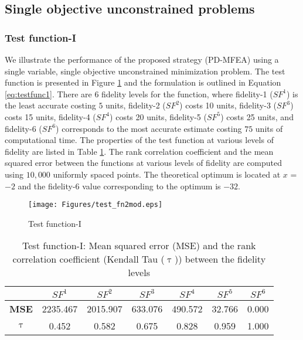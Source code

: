\subsection{Single objective unconstrained problems}

\subsubsection{Test function-I}
We illustrate the performance of the proposed strategy (PD-MFEA) using a single variable, single objective unconstrained minimization problem. The test function is presented in Figure \ref{fig:test_fn2mod} and the formulation is outlined in Equation \ref{eq:testfunc1}. There are $6$ fidelity levels for the function, where fidelity-1 ($SF^1$) is the least accurate costing $5$ units, fidelity-2 ($SF^2$) costs 10 units, fidelity-3 ($SF^3$) costs 15 units, fidelity-4 ($SF^4$) costs 20 units, fidelity-5 ($SF^5$) costs 25 units, and fidelity-6 ($SF^6$) corresponds to the most accurate estimate costing $75$ units of computational time. The properties of the test function at various levels of fidelity are listed in Table \ref{table:mse_tau_test_fn2mod}. The rank correlation coefficient and the mean squared error between the functions at various levels of fidelity are computed using $10,000$ uniformly spaced points. The theoretical optimum is located at $x$ = $-2$ and the fidelity-6 value corresponding to the optimum is $-32$.

\begin{figure}[!ht]
	\centering
	\texttt{[image: Figures/test\_fn2mod.eps]}
	\caption{Test function-I}
	\label{fig:test_fn2mod}       
\end{figure}

\begin{table}[!htb]\footnotesize
	\centering
	\caption{Test function-I: Mean squared error (MSE) and the rank correlation coefficient (Kendall Tau ($\uptau$)) between the fidelity levels}
	\label{table:mse_tau_test_fn2mod}
	\begin{tabular}{|c|c|c|c|c|c|c|}
		\noalign{\smallskip}\hline
		&$SF^1$&$SF^2$&$SF^3$&$SF^4$&$SF^5$&$SF^6$\\ \hline
		\textbf{MSE}&2235.467&2015.907&633.076&490.572&32.766&0.000\\ \hline
		\textbf{$\uptau$}&0.452&0.582&0.675& 0.828& 0.959& 1.000\\ \hline
	\end{tabular}
\end{table}

